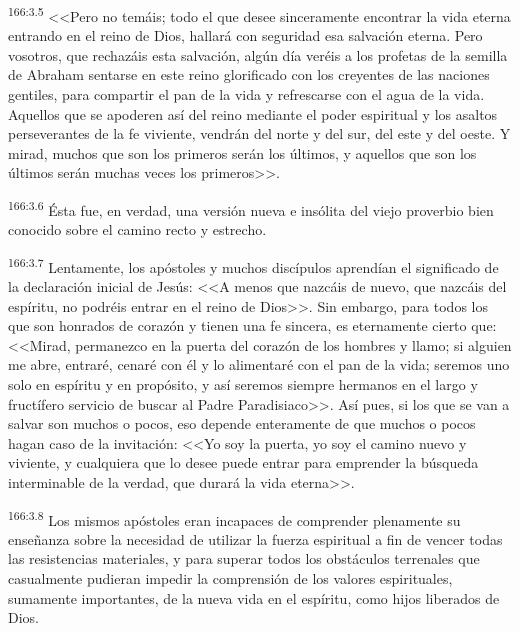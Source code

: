 \par 
\textsuperscript{166:3.5} <<Pero no temáis; todo el que desee sinceramente encontrar la vida eterna entrando en el reino de Dios, hallará con seguridad esa salvación eterna. Pero vosotros, que rechazáis esta salvación, algún día veréis a los profetas de la semilla de Abraham sentarse en este reino glorificado con los creyentes de las naciones gentiles, para compartir el pan de la vida y refrescarse con el agua de la vida. Aquellos que se apoderen así del reino mediante el poder espiritual y los asaltos perseverantes de la fe viviente, vendrán del norte y del sur, del este y del oeste. Y mirad, muchos que son los primeros serán los últimos, y aquellos que son los últimos serán muchas veces los primeros>>.

\par 
\textsuperscript{166:3.6} Ésta fue, en verdad, una versión nueva e insólita del viejo proverbio bien conocido sobre el camino recto y estrecho.

\par 
\textsuperscript{166:3.7} Lentamente, los apóstoles y muchos discípulos aprendían el significado de la declaración inicial de Jesús: <<A menos que nazcáis de nuevo, que nazcáis del espíritu, no podréis entrar en el reino de Dios>>. Sin embargo, para todos los que son honrados de corazón y tienen una fe sincera, es eternamente cierto que: <<Mirad, permanezco en la puerta del corazón de los hombres y llamo; si alguien me abre, entraré, cenaré con él y lo alimentaré con el pan de la vida; seremos uno solo en espíritu y en propósito, y así seremos siempre hermanos en el largo y fructífero servicio de buscar al Padre Paradisiaco>>. Así pues, si los que se van a salvar son muchos o pocos, eso depende enteramente de que muchos o pocos hagan caso de la invitación: <<Yo soy la puerta, yo soy el camino nuevo y viviente, y cualquiera que lo desee puede entrar para emprender la búsqueda interminable de la verdad, que durará la vida eterna>>.

\par 
\textsuperscript{166:3.8} Los mismos apóstoles eran incapaces de comprender plenamente su enseñanza sobre la necesidad de utilizar la fuerza espiritual a fin de vencer todas las resistencias materiales, y para superar todos los obstáculos terrenales que casualmente pudieran impedir la comprensión de los valores espirituales, sumamente importantes, de la nueva vida en el espíritu, como hijos liberados de Dios.

